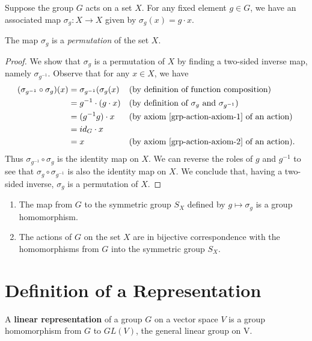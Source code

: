 Suppose the group $G$ acts on a set $X$.  For any fixed element $g \in G$, we have an associated map $\sigma_g : X \to X$ given by $\sigma_g (x) = g \cdot x$.
\begin{prop}
The map $\sigma_g$ is a \textit{permutation} of the set $X$.
\end{prop}
\begin{proof}
We show that $\sigma_g$ is a permutation of $X$ by finding a two-sided inverse map, namely $\sigma_{g^{-1}}$. Observe that for any $x \in X$, we have
\begin{align*}
(\sigma_{g^{-1}} \circ \sigma_g) (x) &= \sigma_{g^{-1}} ( \sigma_g (x) && \text{(by definition of function composition)} \\
					&= g^{-1} \cdot (g \cdot x) && \text{(by definition of $\sigma_g$ and $\sigma_{g^{-1}}$)} \\
					&= (g^{-1}g) \cdot x &&\text{(by axiom \ref{grp-action-axiom-1} of an action)} \\
					&= id_G \cdot x \\
					&= x &&\text{(by axiom \ref{grp-action-axiom-2} of an action)}.
\end{align*}
Thus $\sigma_{g^{-1}} \circ \sigma_g$ is the identity map on $X$. We can reverse the roles of $g$ and $g^{-1}$ to see that $\sigma_g \circ \sigma_{g^{-1}}$ is also the identity map on $X$.  We conclude that, having a two-sided inverse, $\sigma_g$ is a permutation of $X$.
\end{proof}


\begin{prop} 
\leavevmode
\begin{enumerate}
\item The map from $G$ to the symmetric group $S_X$ defined by $g \mapsto \sigma_g$ is a group homomorphism.
\item The actions of $G$ on the set $X$ are in bijective correspondence with the homomorphisms from $G$ into the symmetric group $S_X$.
\end{enumerate}
\end{prop}


\section{Definition of a Representation}
\begin{defn}
\label{repdef1}
A \textbf{linear representation} of a group $G$ on a vector space $V$  is a group homomorphism from $G$ to $GL(V)$, the general linear group on V. \end{defn}
 
